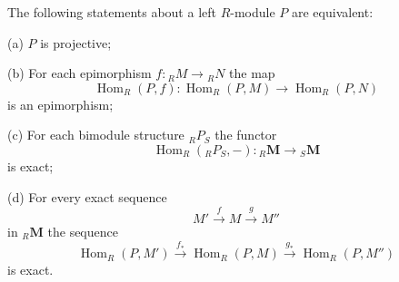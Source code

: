 The following statements about a left $R$-module $P$ are equivalent:

(a) $P$ is projective;

(b) For each epimorphism $f: {}_R M \rightarrow {}_R N$ the map
$$\operatorname{Hom}_R(P, f): \operatorname{Hom}_R(P, M) \rightarrow \operatorname{Hom}_R(P, N)$$
is an epimorphism;

(c) For each bimodule structure ${}_R P_S$ the functor
$$\operatorname{Hom}_R({}_R P_S, -): {}_R\mathbf{M} \rightarrow {}_S\mathbf{M}$$
is exact;

(d) For every exact sequence
$$M' \xrightarrow{f} M \xrightarrow{g} M''$$
in ${}_R\mathbf{M}$ the sequence
$$\operatorname{Hom}_R(P, M') \xrightarrow{f_*} \operatorname{Hom}_R(P, M) \xrightarrow{g_*} \operatorname{Hom}_R(P, M'')$$
is exact.
